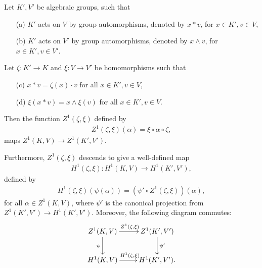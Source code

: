 \begin{lemma} \label{h1maps} Let $K', V'$ be algebraic groups, such that
	\begin{itemize}
		\item[(a)] $K'$ acts on $V$ by group automorphisms, denoted by $x \ast v$, for $x \in K', v \in V$,
		\item[(b)] $K'$ acts on $V'$ by group automorphisms, denoted by $x \wedge v$, for $x \in K', v \in V'$.
	\end{itemize}
	Let $\zeta:K' \rightarrow K$ and $\xi: V \rightarrow V'$ be homomorphisms such that
	\begin{itemize}
		\item[(c)] $x \ast v = \zeta(x) \cdot v$ for all $x \in K', v \in V$,
		\item[(d)] $\xi(x \ast v) = x \wedge \xi(v)$ for all $x \in K', v \in V$.
	\end{itemize}
	Then the function $Z^1(\zeta, \xi)$ defined by
	\begin{align*}
		Z^1(\zeta, \xi)(\alpha) = \xi \circ \alpha \circ \zeta,
	\end{align*}
	maps $Z^1(K, V) \rightarrow Z^1(K', V')$.

	Furthermore, $Z^1(\zeta, \xi)$ descends to give a well-defined map
	\begin{align*}
		H^1(\zeta, \xi):H^1(K, V) \rightarrow H^1(K', V'),
	\end{align*}
	defined by
	\begin{align*}
		H^1(\zeta, \xi)(\psi(\alpha)) = \left(\psi' \circ Z^1(\zeta, \xi)\right)(\alpha),
	\end{align*}
	for all $\alpha \in Z^1(K, V)$, where $\psi'$ is the canonical projection from $Z^1(K', V') \rightarrow H^1(K', V')$.
	Moreover, the following diagram commutes:
	\begin{align*}
		\xymatrix{
			Z^1(K, V) \ar[r]^{Z^1(\zeta, \xi)} \ar[d]_{\psi} & Z^1(K', V') \ar[d]^{\psi'} \\
			H^1(K, V) \ar[r]^{H^1(\zeta, \xi)}               & H^1(K', V').
		}
	\end{align*}
\end{lemma}
